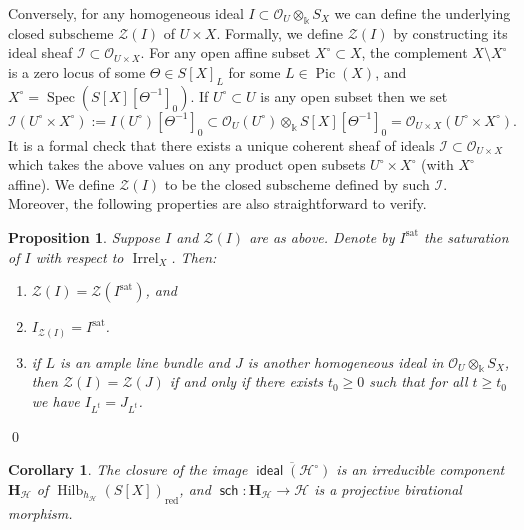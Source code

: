 \documentclass[10pt,a4paper]{amsart}
\newtheorem{prop}{Proposition}
\newtheorem{cor}{Corollary}
\DeclareMathOperator{\Hilb}{Hilb}
\newcommand{\Irrel}[1]{\operatorname {Irrel}_{#1}}
\DeclareMathOperator{\Pic}{Pic}
\DeclareMathOperator{\Spec}{Spec}
\newcommand{\ccH}{{\mathcal{H}}}
\newcommand{\ccI}{{\mathcal{I}}}
\newcommand{\ccO}{{\mathcal{O}}}
\newcommand{\ccZ}{{\mathcal{Z}}}
\DeclareMathOperator{\idealmap}{\mathsf {ideal}}
\def\kk{{\Bbbk}}
\newcommand{\noprf}{\nopagebreak\qed\par}
\newcommand{\reduced}[1]{{#1}_{\operatorname{red}}}
\DeclareMathOperator{\sat}{sat}
\DeclareMathOperator{\sch}{\mathsf {sch}}
\begin{document}
Conversely, for any homogeneous ideal  $I\subset \ccO_U \otimes_{\kk} S_X$ we can define the underlying closed subscheme $\ccZ(I)$ of $U\times X$.
 Formally, we define $\ccZ(I)$ by constructing its ideal sheaf $\ccI\subset \ccO_{U\times X}$.
For any open affine subset $X^{\circ}\subset X$, the complement $X\setminus
X^{\circ}$ is a zero locus of some $\Theta\in S[X]_L$ for some $L\in \Pic(X)$, and $X^{\circ}= \Spec(S[X][\Theta^{-1}]_0)$.
If $U^{\circ}\subset U$ is any open subset
then we set
\[
  \ccI(U^{\circ}\times X^{\circ}):=I(U^{\circ})[\Theta^{-1}]_0\subset \ccO_{U}(U^{\circ})\otimes_{\kk} S[X][\Theta^{-1}]_0 = \ccO_{U\times X}(U^{\circ}\times X^{\circ}).
\]
It is a formal check that there exists a unique coherent sheaf of ideals $\ccI\subset \ccO_{U\times X}$ which takes the above values on any product
open subsets $U^{\circ}\times X^{\circ}$ (with $X^{\circ}$ affine).
We define $\ccZ(I)$ to be the closed subscheme defined by such $\ccI$.
Moreover, the following properties are also straightforward to verify.
\begin{prop}
\label{prop_zero_scheme_of_ideal}
   Suppose $I$ and $\ccZ(I)$ are as above. Denote by $I^{\sat}$ the saturation of $I$ with respect to $\Irrel{X}$. Then:
   \begin{enumerate}
    \item \label{item_zero_scheme_of_ideal_and_its_saturation}
         $\ccZ(I)=\ccZ(I^{\sat})$, and
    \item
    \label{item_ideal_of_zero_scheme}
       $I_{\ccZ(I)} = I^{\sat}$.
    \item
    \label{item_two_ideals_have_the_same_zero_scheme}
       if $L$ is an ample line bundle and $J$ is another homogeneous ideal in $\ccO_U \otimes_{\kk} S_X$, then
    $\ccZ(I) = \ccZ(J)$ if and only if there exists $t_0\geqslant 0$ such that for all $t\geqslant t_0$ we have $I_{L^{t}} = J_{L^{t}}$.
   \end{enumerate}
\end{prop}
\noprf

\begin{cor}
\label{cor_saturation_map_is_birational}
  The closure of the image
    $\overline{\idealmap(\ccH^{\circ})}$ is an irreducible component $\mathbf{H}_{\ccH}$ of $\reduced{\Hilb_{h_{\ccH}}(S[X])}$,
    and $\sch\colon\mathbf{H}_{\ccH} \to \ccH$ is a projective birational morphism.
\end{cor}
\end{document}
